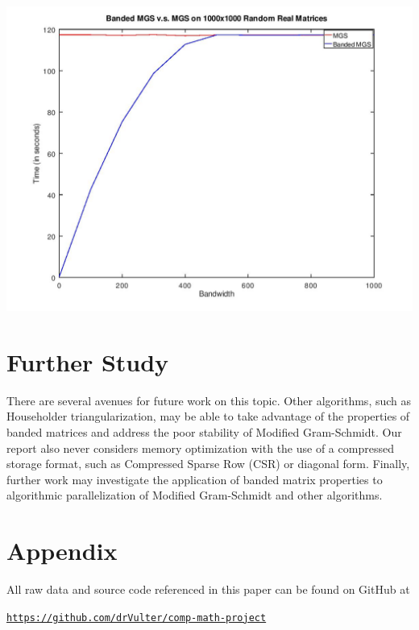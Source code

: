 \documentclass{article}
\numberwithin{pic}{section}
\numberwithin{lem}{section}
\numberwithin{thm}{section}
\numberwithin{cor}{section}
\theoremstyle{definition}
\numberwithin{ex}{section}
\numberwithin{defn}{section}
\theoremstyle{definition}
\theoremstyle{remark}
\newlength\tindent
\renewcommand{\indent}{\hspace*{\tindent}}
\begin{document}
\begin{center}
  \includegraphics[scale=0.4]{pi-data.jpg}
\end{center}
\section{Further Study}
\indent There are several avenues for future work on this topic. Other
algorithms, such as Householder triangularization, may be able to take advantage
of the properties of banded matrices and address the poor stability of Modified
Gram-Schmidt. Our report also never considers memory optimization with the use
of a compressed storage format, such as Compressed Sparse Row (CSR) or diagonal
form. Finally, further work may investigate the application of banded matrix
properties to algorithmic parallelization of Modified Gram-Schmidt and other
algorithms.
\appendix
{}
\section*{Appendix}
All raw data and source code referenced in this paper can be found on
GitHub at
\begin{center}
  \href{https://github.com/drVulter/comp-math-project}{\texttt{https://github.com/drVulter/comp-math-project}}
\end{center}
	

\end{document}
